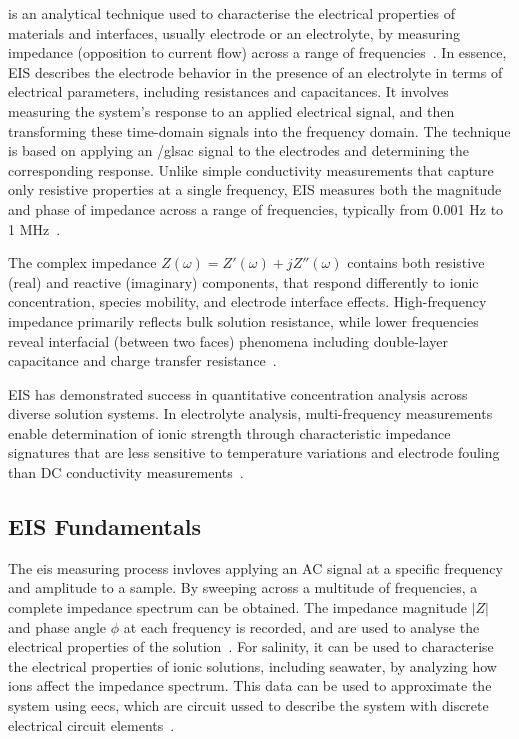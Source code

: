  is an analytical technique used to characterise the electrical properties of materials and interfaces, usually electrode or an electrolyte, by measuring impedance (opposition to current flow) across a range of frequencies~\cite{canales_electrochemical_2021}.
In essence, EIS describes the electrode behavior in the presence of an electrolyte in terms of electrical parameters, including resistances and capacitances.
It involves measuring the system's response to an applied electrical signal, and then transforming these time-domain signals into the frequency domain.
The technique is based on applying an /gls{ac} signal to the electrodes and determining the corresponding response.
Unlike simple conductivity measurements that capture only resistive properties at a single frequency, EIS measures both the magnitude and phase of impedance across a range of frequencies, typically from 0.001 Hz to 1 MHz~\cite{barsoukov_impedance_2005}.

The complex impedance $Z(\omega)=Z'(\omega)+jZ''(\omega)$ contains both resistive (real) and reactive (imaginary) components, that respond differently to ionic concentration, species mobility, and electrode interface effects.
High-frequency impedance primarily reflects bulk solution resistance, while lower frequencies reveal interfacial (between two faces) phenomena including double-layer capacitance and charge transfer resistance~\cite{orazem_electrochemical_2008}.

EIS has demonstrated success in quantitative concentration analysis across diverse solution systems.
In electrolyte analysis, multi-frequency measurements enable determination of ionic strength through characteristic impedance signatures that are less sensitive to temperature variations and electrode fouling than DC conductivity measurements~\cite{barsoukov_impedance_2005}.


\subsection{EIS Fundamentals}
The \gls{eis} measuring process invloves applying an AC signal at a specific frequency and amplitude to a sample.
By sweeping across a multitude of frequencies, a complete impedance spectrum can be obtained.
The impedance magnitude $|Z|$ and phase angle $\phi$ at each frequency is recorded, and are used to analyse the electrical properties of the solution~\cite{orazem_electrochemical_2008}.
For salinity, it can be used to characterise the electrical properties of ionic solutions, including seawater, by analyzing how ions affect the impedance spectrum. 
This data can be used to approximate the system using \glspl{eec}, which are circuit ussed to describe the system with discrete electrical circuit elements~\cite{barsoukov_impedance_2005}.
